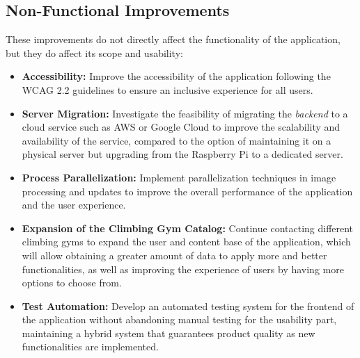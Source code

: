\subsection{Non-Functional Improvements} These improvements do not directly affect the functionality of the application, but they do affect its scope and usability: 

\begin{itemize}
\item \textbf{Accessibility:} Improve the accessibility of the application following the WCAG 2.2 guidelines to ensure an inclusive experience for all users. \item \textbf{Server Migration:} Investigate the feasibility of migrating the \textit{backend} to a cloud service such as AWS or Google Cloud to improve the scalability and availability of the service, compared to the option of maintaining it on a physical server but upgrading from the Raspberry Pi to a dedicated server. \item \textbf{Process Parallelization:} Implement parallelization techniques in image processing and updates to improve the overall performance of the application and the user experience. \item \textbf{Expansion of the Climbing Gym Catalog:} Continue contacting different climbing gyms to expand the user and content base of the application, which will allow obtaining a greater amount of data to apply more and better functionalities, as well as improving the experience of users by having more options to choose from. \item \textbf{Test Automation:} Develop an automated testing system for the frontend of the application without abandoning manual testing for the usability part, maintaining a hybrid system that guarantees product quality as new functionalities are implemented. 
\end{itemize}